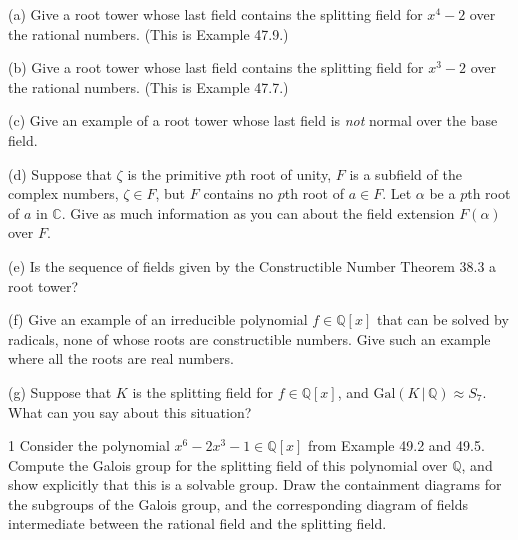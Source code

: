 \begin{problem}[Warmup]{(a)}
    Give a root tower whose last field contains the splitting field for $x^4 - 2$ over the rational numbers. (This is Example 47.9.)
\end{problem}
\unsolved

\begin{problem}[Warmup]{(b)}
    Give a root tower whose last field contains the splitting field for $x^3 - 2$ over the rational numbers. (This is Example 47.7.)
\end{problem}
\unsolved

\begin{problem}[Warmup]{(c)}
    Give an example of a root tower whose last field is \emph{not} normal over the base field.
\end{problem}
\unsolved

\begin{problem}[Warmup]{(d)}
    Suppose that $\zeta$ is the primitive $p$th root of unity, $F$ is a subfield of the complex numbers, $\zeta \in F$, but $F$ contains no $p$th root of $a \in F$. Let $\alpha$ be a $p$th root of $a$ in $\mathbb{C}$. Give as much information as you can about the field extension $F(\alpha)$ over $F$.
\end{problem}
\unsolved

\begin{problem}[Warmup]{(e)}
    Is the sequence of fields given by the Constructible Number Theorem 38.3 a root tower?
\end{problem}
\unsolved

\begin{problem}[Warmup]{(f)}
    Give an example of an irreducible polynomial $f \in \mathbb{Q}[x]$ that can be solved by radicals, none of whose roots are constructible numbers. Give such an example where all the roots are real numbers.
\end{problem}
\unsolved

\begin{problem}[Warmup]{(g)}
    Suppose that $K$ is the splitting field for $f \in \mathbb{Q}[x]$, and $\mathrm{Gal}(K \,|\, \mathbb{Q}) \approx S_7$. What can you say about this situation?
\end{problem}
\unsolved

\begin{problem}{1}
    Consider the polynomial $x^6 - 2x^3 - 1 \in \mathbb{Q}[x]$ from Example 49.2 and 49.5.
    Compute the Galois group for the splitting field of this polynomial over $\mathbb{Q}$,
    and show explicitly that this is a solvable group. Draw the containment diagrams for
    the subgroups of the Galois group, and the corresponding diagram of fields intermediate
    between the rational field and the splitting field.
\end{problem}
\unsolved

